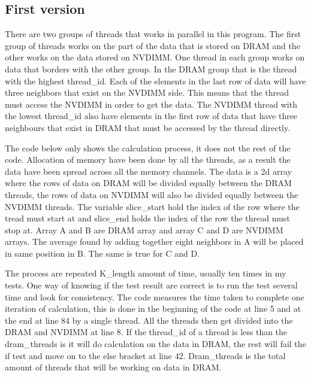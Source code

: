 \documentclass[12pt,a4paper,USenglish]{article}      %
\begin{document}
\subsection{First version}
There are two groups of threads that works in parallel in this program. The first group of threads works on the part of the data that is stored on DRAM and the other works on the data stored on NVDIMM. 
One thread in each group works on data that borders with the other group. In the DRAM group that is the thread with the highest thread\_id. Each of the elements in the last row of data will have three neighbors that exist on the NVDIMM side. This means that the thread must access the NVDIMM in order to get the data. The NVDIMM thread with the lowest thread\_id also have elements in the first row of data that have three neighbours that exist in DRAM that must be accessed by the thread directly.

The code below only shows the calculation process, it does not the rest of the code. Allocation of memory have been done by all the threads, as a result the data have been spread across all the memory channels. 
The data is a 2d array where the rows of data on DRAM will be divided equally between the DRAM threads, the rows of data on NVDIMM will also be divided equally between the NVDIMM threads. The variable slice\_start hold the index of the row where the tread must start at and slice\_end holds the index of the row the thread must stop at.
Array A and B are DRAM array and array C and D are NVDIMM arrays. The average found by adding together eight neighbors in A will be placed in same position in B. The same is true for C and D.

The process are repeated K\_length amount of time, usually ten times in my tests. One way of knowing if the test result are correct is to run the test several time and look for consistency.
The code measures the time taken to complete one iteration of calculation, this is done in the beginning of the code at line 5 and at the end at line 84 by a single thread.
All the threads then get divided into the DRAM and NVDIMM at line 8. If the thread\_id of a thread is less than the dram\_threads is it will do calculation on the data in DRAM, the rest will fail the if test and move on to the else bracket at line 42. Dram\_threads is the total amount of threads that will be working on data in DRAM.
\end{document}

